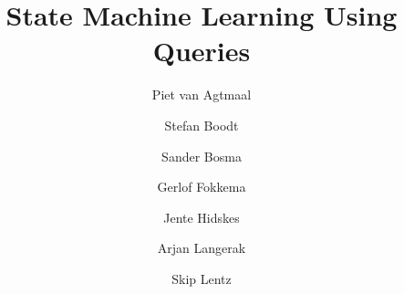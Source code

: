 \documentclass[a4paper]{article}
\title{State Machine Learning Using Queries}
\author{%
Piet van Agtmaal \and
Stefan Boodt \and
Sander Bosma \and
Gerlof Fokkema \and
Jente Hidskes \and
Arjan Langerak \and
Skip Lentz}
\date{}
\begin{document}
\maketitle





















{}


\end{document}
